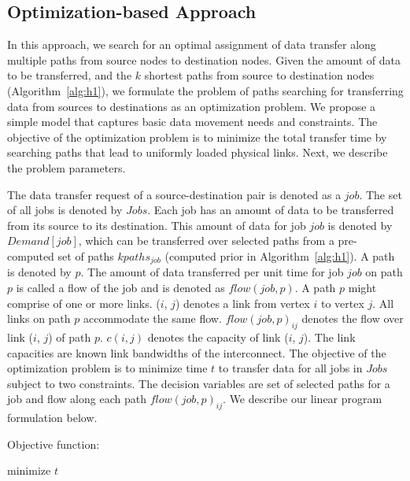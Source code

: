 \subsection{Optimization-based Approach}
\label{sec:optimization}

In this approach, we search for an optimal assignment of data transfer along multiple paths from source nodes to destination nodes. Given the amount of data to be transferred, and the $k$ shortest paths from source to destination nodes (Algorithm~\ref{alg:h1}), we formulate the problem of paths searching for transferring data from sources to destinations as an optimization problem. We propose a simple model that captures basic data movement needs and constraints. The objective of the optimization problem is to minimize the total transfer time by searching paths that lead to uniformly loaded physical links. Next, we describe the problem parameters.

The data transfer request of a source-destination pair is denoted as a $job$. The set of all jobs is denoted by $Jobs$. Each job has an amount of data to be transferred from its source to its destination. This amount of data for job $job$ is denoted by $Demand[job]$, which can be transferred over selected paths from a pre-computed set of paths $kpaths_{job}$ (computed prior in Algorithm~\ref{alg:h1}). A path is denoted by $p$. The amount of data transferred per unit time for job $job$ on path $p$ is called a flow of the job and is denoted as $flow(job, p)$. A path $p$ might comprise of one or more links. ($i$, $j$) denotes a link from vertex $i$ to vertex $j$. All links on path $p$ accommodate the same flow. $flow(job, p)_{ij}$ denotes the flow over link ($i$, $j$) of path $p$. $c(i,j)$ denotes the capacity of link ($i$, $j$). The link capacities are known link bandwidths of the interconnect. The objective of the optimization problem is to minimize time $t$ to transfer data for all jobs in $Jobs$ subject to two constraints. The decision variables are set of selected paths for a job and flow along each path $flow(job, p)_{ij}$. We describe our linear program formulation below.

Objective function:

\begin{center}
minimize $t$
\end{center}


